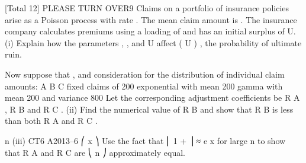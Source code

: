 \documentclass[a4paper,12pt]{article}
\begin{document}
[Total 12]
PLEASE TURN OVER9
Claims on a portfolio of insurance policies arise as a Poisson process with rate \lambda .
The mean claim amount is \mu  . The insurance company calculates premiums using a
loading of \theta   and has an initial surplus of U.
(i)
Explain how the parameters \lambda , \mu  , \theta   and U affect \psi ( U ) , the probability of
ultimate ruin.

Now suppose that ,  and %
consideration for the distribution of individual claim amounts:
A
B
C
fixed claims of 200
exponential with mean 200
gamma with mean 200 and variance 800
Let the corresponding adjustment coefficients be R A , R B and R C .
(ii)
Find the numerical value of R B and show that R B is less than both R A and
R C .

n
(iii)
CT6 A2013–6
⎛ x ⎞
Use the fact that ⎜ 1 + ⎟ ≈ e x for large n to show that R A and R C are
⎝ n ⎠
approximately equal.


\newpage
\end{document}
